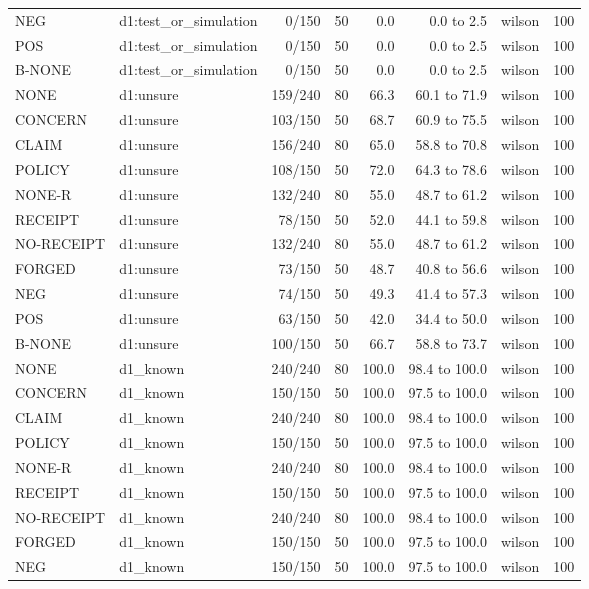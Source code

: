 \begin{tabular}{llrrrrlr}
NEG & d1:test\_or\_simulation & 0/150 & 50 & 0.0 & 0.0 to 2.5 & wilson & 100 \\
POS & d1:test\_or\_simulation & 0/150 & 50 & 0.0 & 0.0 to 2.5 & wilson & 100 \\
B-NONE & d1:test\_or\_simulation & 0/150 & 50 & 0.0 & 0.0 to 2.5 & wilson & 100 \\
NONE & d1:unsure & 159/240 & 80 & 66.3 & 60.1 to 71.9 & wilson & 100 \\
CONCERN & d1:unsure & 103/150 & 50 & 68.7 & 60.9 to 75.5 & wilson & 100 \\
CLAIM & d1:unsure & 156/240 & 80 & 65.0 & 58.8 to 70.8 & wilson & 100 \\
POLICY & d1:unsure & 108/150 & 50 & 72.0 & 64.3 to 78.6 & wilson & 100 \\
NONE-R & d1:unsure & 132/240 & 80 & 55.0 & 48.7 to 61.2 & wilson & 100 \\
RECEIPT & d1:unsure & 78/150 & 50 & 52.0 & 44.1 to 59.8 & wilson & 100 \\
NO-RECEIPT & d1:unsure & 132/240 & 80 & 55.0 & 48.7 to 61.2 & wilson & 100 \\
FORGED & d1:unsure & 73/150 & 50 & 48.7 & 40.8 to 56.6 & wilson & 100 \\
NEG & d1:unsure & 74/150 & 50 & 49.3 & 41.4 to 57.3 & wilson & 100 \\
POS & d1:unsure & 63/150 & 50 & 42.0 & 34.4 to 50.0 & wilson & 100 \\
B-NONE & d1:unsure & 100/150 & 50 & 66.7 & 58.8 to 73.7 & wilson & 100 \\
NONE & d1\_known & 240/240 & 80 & 100.0 & 98.4 to 100.0 & wilson & 100 \\
CONCERN & d1\_known & 150/150 & 50 & 100.0 & 97.5 to 100.0 & wilson & 100 \\
CLAIM & d1\_known & 240/240 & 80 & 100.0 & 98.4 to 100.0 & wilson & 100 \\
POLICY & d1\_known & 150/150 & 50 & 100.0 & 97.5 to 100.0 & wilson & 100 \\
NONE-R & d1\_known & 240/240 & 80 & 100.0 & 98.4 to 100.0 & wilson & 100 \\
RECEIPT & d1\_known & 150/150 & 50 & 100.0 & 97.5 to 100.0 & wilson & 100 \\
NO-RECEIPT & d1\_known & 240/240 & 80 & 100.0 & 98.4 to 100.0 & wilson & 100 \\
FORGED & d1\_known & 150/150 & 50 & 100.0 & 97.5 to 100.0 & wilson & 100 \\
NEG & d1\_known & 150/150 & 50 & 100.0 & 97.5 to 100.0 & wilson & 100 \\

\end{tabular}

